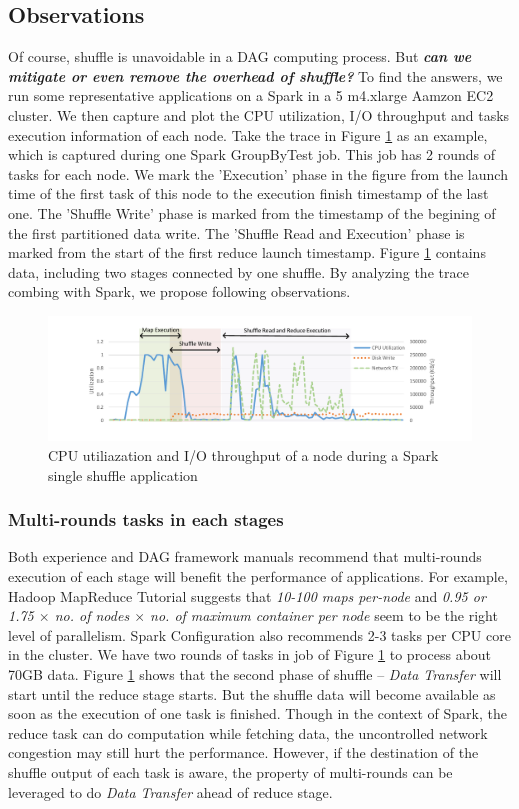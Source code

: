 \subsection{Observations} \label{observation}
Of course, shuffle is unavoidable in a DAG computing process. But \textbf{\textit{can we mitigate or even remove the overhead of shuffle?}} To find the answers, we run some representative applications on a Spark in a 5 m4.xlarge Aamzon EC2 cluster. We then capture and plot the CPU utilization, I/O throughput and tasks execution information of each node. Take the trace in Figure \ref{fig:util} as an example, which is captured during one Spark GroupByTest job. This job has 2 rounds of tasks for each node. We mark the 'Execution' phase in the figure from the launch time of the first task of this node to the execution finish timestamp of the last one. The 'Shuffle Write' phase is marked from the timestamp of the begining of the first partitioned data write. The 'Shuffle Read and Execution' phase is marked from the start of the first reduce launch timestamp.
Figure \ref{fig:util} contains data, including two stages connected by one shuffle. By analyzing the trace combing with Spark, we propose following observations.
\begin{figure}
	\includegraphics[width=\textwidth]{fig/util}
	\caption{CPU utiliazation and I/O throughput of a node during a Spark single shuffle application}
	\label{fig:util}
\end{figure}

\subsubsection{Multi-rounds tasks in each stages}\label{multi}
Both experience and DAG framework manuals recommend that multi-rounds execution of each stage will benefit the performance of applications.
For example, Hadoop MapReduce Tutorial \cite{hadooptutorial} suggests that \textit{10-100 maps per-node} and \textit{0.95 or 1.75 $\times$ no. of nodes $\times$ no. of maximum container per node} seem to be the right level of parallelism. Spark Configuration also recommends 2-3 tasks per CPU core in the cluster\cite{sparkconf}.
We have two rounds of tasks in job of Figure \ref{fig:util} to process about 70GB data. Figure \ref{fig:util} shows that the second phase of shuffle -- \textit{Data Transfer} will start until the reduce stage starts.
But the shuffle data will become available as soon as the execution of one task is finished. Though in the context of Spark, the reduce task can do computation while fetching data, the uncontrolled network congestion may still hurt the performance. However, if the destination of the shuffle output of each task is aware, the property of multi-rounds can be leveraged to do \textit{Data Transfer} ahead of reduce stage.

